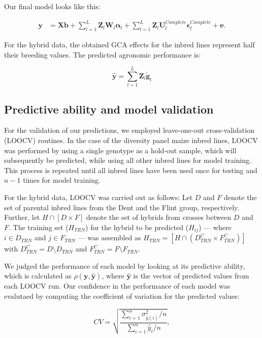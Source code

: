 \documentclass[12pt,titlepage]{article}
\begin{document}
Our final model looks like this:

\begin{align} \label{eq:final-model}
\mathbf{y} &= \mathbf{Xb} +
\sum_{l=1}^{L} \mathbf{Z}_{l}\mathbf{W}_{l} \boldsymbol{\alpha}_{l} + 
\sum_{l=1}^{L} \mathbf{Z}_{l}\mathbf{U}_{l}^{Complete} \boldsymbol{\epsilon}_{l}^{Complete} +
\mathbf{e}.
\end{align}

For the hybrid data, the obtained GCA effects for the inbred lines represent 
half their breeding values.
The predicted agronomic performance is:

\begin{equation} \label{eq:predicted-performance}
\hat{\mathbf{y}} = \sum_{l=1}^{L} \mathbf{Z}_{l}\tilde{\mathbf{g}}_{l} 
\end{equation}




\subsection{Predictive ability and model validation}
For the validation of our predictions, we employed leave-one-out
cross-validation (LOOCV) routines.
In the case of the diversity panel maize inbred lines, LOOCV was performed by 
using a single genotype as a hold-out sample, which will subsequently be 
predicted, while using all other inbred lines for model training.
This process is repeated until all inbred lines have been used once for testing
and $n - 1$ times for model training.

For the hybrid data, LOOCV was carried out as follows:
Let $D$ and $F$ denote the set of parental inbred lines from the Dent and the 
Flint group, respectively.
Further, let $H \cap [D \times F]$ denote the set of hybrids from crosses 
between $D$ and $F$.
The training set ($H_{TRN}$) for the hybrid to be predicted ($H_{ij}$) --- 
where $i \in D_{TRN}$ and $j \in F_{TRN}$ --- was assembled as 
$H_{TRN} = [H \cap (D_{TRN}^{C} \times F_{TRN}^{C})]$ with
$D_{TRN}^{C} = D \setminus D_{TRN}$ and $F_{TRN}^{C} = F \setminus F_{TRN}$.

We judged the performance of each model by looking at its predictive ability,
which is calculated as $\rho(\mathbf{y}, \mathbf{\hat{y}})$, where 
$\mathbf{\hat{y}}$ is the vector of predicted values from each LOOCV run.
Our confidence in the performance of each model was evalutaed by computing the
coefficient of variation for the predicted values:

\begin{equation} \label{eq:CV}
CV = \sqrt{\frac{\sum_{i = 1}^{n} \sigma^{2}_{\hat{y}(i)} / n}{\sum_{i=1}^{n}\hat{y}_{i} / n}},
\end{equation}
\end{document}
